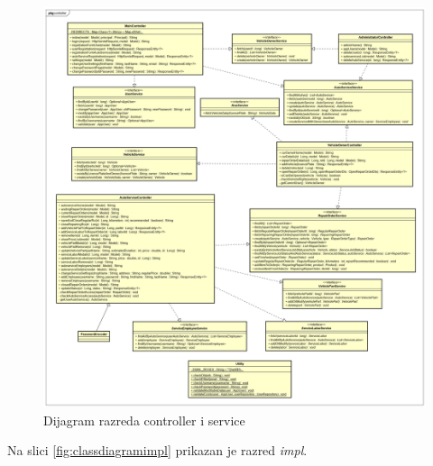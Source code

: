 		\begin{figure}[H]
			\centering
			\includegraphics[width=1.0\linewidth]{dijagrami/class_diagram_ctrl}
			\caption{Dijagram razreda controller i service}
			\label{fig:classdiagramctrl}
		\end{figure}
	
		Na slici \ref{fig:classdiagramimpl} prikazan je razred \textit{impl}.
	

